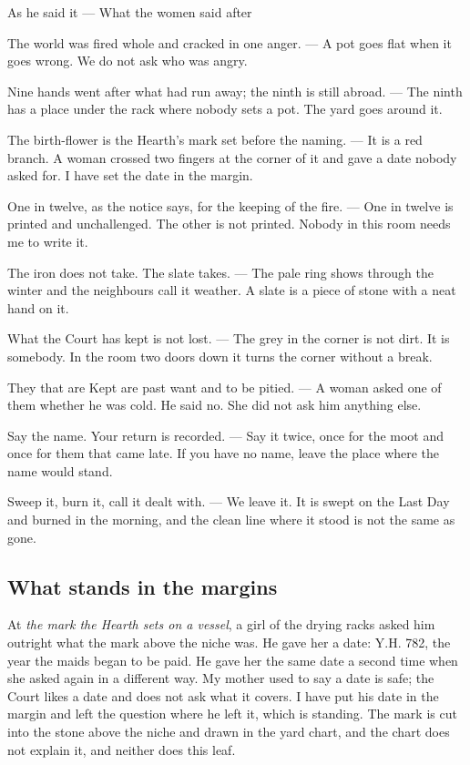 \documentclass{design/chronicle}
\begin{document}
As he said it — What the women said after\par

The world was fired whole and cracked in one anger. — A pot goes flat when it goes wrong. We do not ask who was angry.\par

Nine hands went after what had run away; the ninth is still abroad. — The ninth has a place under the rack where nobody sets a pot. The yard goes around it.\par

The birth-flower is the Hearth’s mark set before the naming. — It is a red branch. A woman crossed two fingers at the corner of it and gave a date nobody asked for. I have set the date in the margin.\par

One in twelve, as the notice says, for the keeping of the fire. — One in twelve is printed and unchallenged. The other is not printed. Nobody in this room needs me to write it.\par

The iron does not take. The slate takes. — The pale ring shows through the winter and the neighbours call it weather. A slate is a piece of stone with a neat hand on it.\par

What the Court has kept is not lost. — The grey in the corner is not dirt. It is somebody. In the room two doors down it turns the corner without a break.\par

They that are Kept are past want and to be pitied. — A woman asked one of them whether he was cold. He said no. She did not ask him anything else.\par

Say the name. Your return is recorded. — Say it twice, once for the moot and once for them that came late. If you have no name, leave the place where the name would stand.\par

Sweep it, burn it, call it dealt with. — We leave it. It is swept on the Last Day and burned in the morning, and the clean line where it stood is not the same as gone.\par

\subsection*{What stands in the margins}

At \emph{the mark the Hearth sets on a vessel}, a girl of the drying racks asked him outright what the mark above the niche was. He gave her a date: Y.H. 782, the year the maids began to be paid. He gave her the same date a second time when she asked again in a different way. My mother used to say a date is safe; the Court likes a date and does not ask what it covers. I have put his date in the margin and left the question where he left it, which is standing. The mark is cut into the stone above the niche and drawn in the yard chart, and the chart does not explain it, and neither does this leaf.
\end{document}
